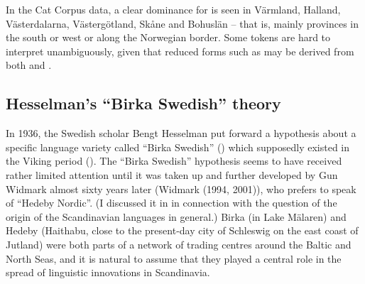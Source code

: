In the Cat Corpus data, a clear dominance for is seen in Värmland, Halland, Västerdalarna, Västergötland, Skåne and Bohuslän – that is, mainly provinces in the south or west or along the Norwegian border. Some tokens are hard to interpret unambiguously, given that reduced forms such as  may be derived from both  and . 



\subsection{Hesselman’s “Birka Swedish” theory}
\label{bkm:Ref134938069}
In 1936, the Swedish scholar Bengt Hesselman put forward a hypothesis about a specific language variety called “Birka Swedish” () which supposedly existed in the Viking period (\citet{Hesselman1936}). The “Birka Swedish” hypothesis seems to have received rather limited attention until it was taken up and further developed by Gun Widmark almost sixty years later (Widmark (1994, 2001)), who prefers to speak of “Hedeby Nordic”. (I discussed it in \citet{Dahl2001} in connection with the question of the origin of the Scandinavian languages in general.) Birka (in Lake Mälaren) and Hedeby (Haithabu, close to the present-day city of Schleswig on the east coast of Jutland) were both parts of a network of trading centres around the Baltic and North Seas, and it is natural to assume that they played a central role in the spread of linguistic innovations in Scandinavia. 



